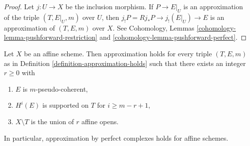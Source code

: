 \begin{proof}
Let $j : U \to X$ be the inclusion morphism.
If $P \to E|_U$ is an approximation of the triple $(T, E|_U, m)$
over $U$, then $j_!P = Rj_*P \to j_!(E|_U) \to E$ is an approximation
of $(T, E, m)$ over $X$.
See Cohomology, Lemmas \ref{cohomology-lemma-pushforward-restriction} and
\ref{cohomology-lemma-pushforward-perfect}.
\end{proof}

\begin{lemma}
\label{lemma-approximation-affine}
Let $X$ be an affine scheme. Then approximation holds for every
triple $(T, E, m)$ as in Definition \ref{definition-approximation-holds}
such that there exists an integer $r \geq 0$ with
\begin{enumerate}
\item $E$ is $m$-pseudo-coherent,
\item $H^i(E)$ is supported on $T$ for $i \geq m - r + 1$,
\item $X \setminus T$ is the union of $r$ affine opens.
\end{enumerate}
In particular, approximation by perfect complexes holds for affine schemes.
\end{lemma}

